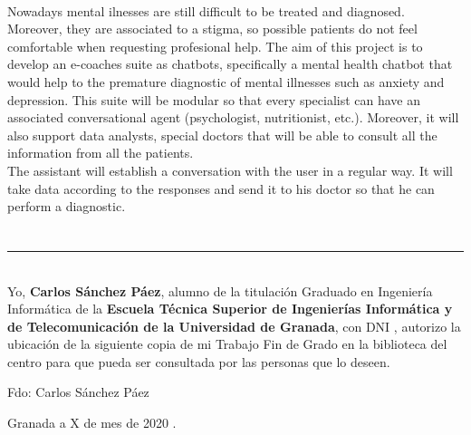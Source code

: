 \vspace{0.7cm}
\\

Nowadays mental ilnesses are still difficult to be treated and diagnosed. Moreover, they are associated to a stigma, so possible patients do not feel
comfortable when requesting profesional help. The aim of this project is to develop an e-coaches suite as chatbots, specifically a mental health chatbot
that would help to the premature diagnostic of mental illnesses such as anxiety and depression. This suite will be modular so that every specialist can have an associated conversational agent (psychologist, nutritionist, etc.). Moreover, it will also support data analysts, special doctors that will be able to consult all the information from all the patients.\\

The assistant will establish a conversation with the user in a regular way. It will take data according to the responses and send it to his doctor so that
he can perform a diagnostic.

\newpage

\section*{}
\thispagestyle{empty}

\noindent\rule[-1ex]{\textwidth}{2pt}\\[4.5ex]

Yo, \textbf{Carlos Sánchez Páez}, alumno de la titulación Graduado en Ingeniería Informática de la \textbf{Escuela Técnica Superior
de Ingenierías Informática y de Telecomunicación de la Universidad de Granada}, con DNI , autorizo la
ubicación de la siguiente copia de mi Trabajo Fin de Grado en la biblioteca del centro para que pueda ser
consultada por las personas que lo deseen.

\vspace{6cm}

\begin{center}
  Fdo: Carlos Sánchez Páez

\end{center}

\vspace{2cm}

\begin{flushright}
Granada a X de mes de 2020 .
\end{flushright}

\newpage

